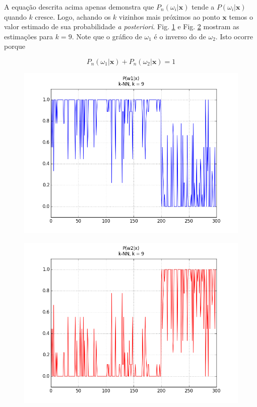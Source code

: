 \documentclass[12pt,twoside]{report}
\newcommand{\figureref}[1]{Fig. \ref{fig:#1}}
\begin{document}
A equação descrita acima apenas demonstra que $P_n(\omega_i|\mathbf{x})$ tende a
$P(\omega_i|\mathbf{x})$ quando $k$ cresce. Logo, achando os $k$ vizinhos mais
próximos ao ponto $\mathbf{x}$ temos o valor estimado de sua probabilidade
\emph{a posteriori}. \figureref{kNN-k9-P_w1_given_x} e \figureref{kNN-k9-P_w2_given_x}
mostram as estimações para $k = 9$. Note que o gráfico de $\omega_1$ é o inverso
do de $\omega_2$. Isto ocorre porque

\begin{equation}
P_n(\omega_1|\mathbf{x}) + P_n(\omega_2|\mathbf{x}) = 1
\label{eq:sum_prob_posteriori}
\end{equation}

\begin{figure}[ht]
    \centering
    \includegraphics[scale=0.6]{kNN-k9-P_w1_given_x}
    \caption{}
    \label{fig:kNN-k9-P_w1_given_x}
\end{figure}

\begin{figure}[ht]
    \centering
    \includegraphics[scale=0.6]{kNN-k9-P_w2_given_x}
    \caption{}
    \label{fig:kNN-k9-P_w2_given_x}
\end{figure}
\end{document}
